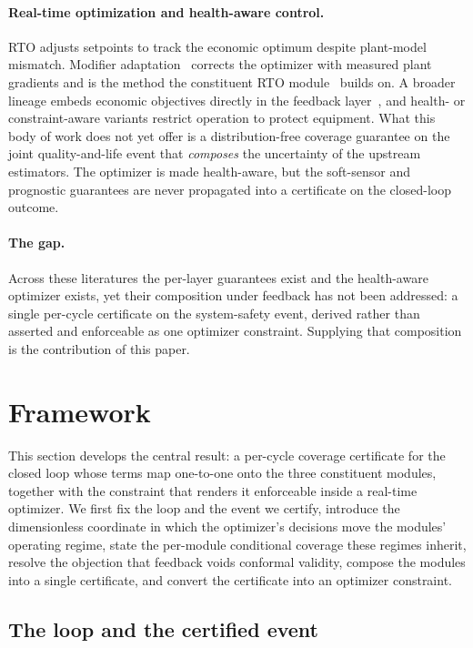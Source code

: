 \documentclass[review,12pt]{elsarticle}
\theoremstyle{definition}
\begin{document}
\paragraph{Real-time optimization and health-aware control.}
RTO adjusts setpoints to track the economic optimum despite plant-model mismatch.
Modifier adaptation~\citep{marchetti2009,chachuat2009} corrects the optimizer with
measured plant gradients and is the method the constituent RTO
module~\citep{busico_m3} builds on. A broader lineage embeds economic objectives
directly in the feedback layer~\citep{skogestad2000}, and health- or constraint-aware
variants restrict operation to protect equipment. What this body of work does not yet
offer is a distribution-free coverage guarantee on the joint quality-and-life event that
\emph{composes} the uncertainty of the upstream estimators. The optimizer is made
health-aware, but the soft-sensor and prognostic guarantees are never propagated into a
certificate on the closed-loop outcome.

\paragraph{The gap.}
Across these literatures the per-layer guarantees exist and the health-aware optimizer
exists, yet their composition under feedback has not been addressed: a single per-cycle
certificate on the system-safety event, derived rather than asserted and enforceable as
one optimizer constraint. Supplying that composition is the contribution of this paper.

\section{Framework}
\label{sec:framework}

This section develops the central result: a per-cycle coverage certificate for
the closed loop whose terms map one-to-one onto the three constituent modules,
together with the constraint that renders it enforceable inside a real-time
optimizer. We first fix the loop and the event we certify, introduce the
dimensionless coordinate in which the optimizer's decisions move the modules'
operating regime, state the per-module conditional coverage these regimes
inherit, resolve the objection that feedback voids conformal validity, compose
the modules into a single certificate, and convert the certificate into an
optimizer constraint.

\subsection{The loop and the certified event}
\label{sec:loop}
\end{document}
